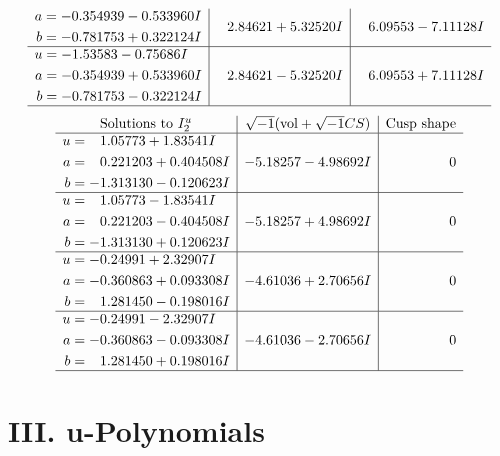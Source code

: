 \documentclass[1p]{elsarticle_modified}
\theoremstyle{definition}
\newcommand{\I}{\sqrt{-1}}
\begin{document}
$$\begin{array}{c|c|c}
\begin{aligned}
a &= -0.354939 - 0.533960 I \\
b &= -0.781753 + 0.322124 I\end{aligned}
 & \phantom{-}2.84621 + 5.32520 I & \phantom{-}6.09553 - 7.11128 I \\ \hline\begin{aligned}
u &= -1.53583 - 0.75686 I \\
a &= -0.354939 + 0.533960 I \\
b &= -0.781753 - 0.322124 I\end{aligned}
 & \phantom{-}2.84621 - 5.32520 I & \phantom{-}6.09553 + 7.11128 I\\
 \hline 
 \end{array}$$\newpage$$\begin{array}{c|c|c}  
\text{Solutions to }I^u_{2}& \I (\text{vol} + \sqrt{-1}CS) & \text{Cusp shape}\\
 \hline 
\begin{aligned}
u &= \phantom{-}1.05773 + 1.83541 I \\
a &= \phantom{-}0.221203 + 0.404508 I \\
b &= -1.313130 - 0.120623 I\end{aligned}
 & -5.18257 - 4.98692 I & \phantom{-0.000000 } 0 \\ \hline\begin{aligned}
u &= \phantom{-}1.05773 - 1.83541 I \\
a &= \phantom{-}0.221203 - 0.404508 I \\
b &= -1.313130 + 0.120623 I\end{aligned}
 & -5.18257 + 4.98692 I & \phantom{-0.000000 } 0 \\ \hline\begin{aligned}
u &= -0.24991 + 2.32907 I \\
a &= -0.360863 + 0.093308 I \\
b &= \phantom{-}1.281450 - 0.198016 I\end{aligned}
 & -4.61036 + 2.70656 I & \phantom{-0.000000 } 0 \\ \hline\begin{aligned}
u &= -0.24991 - 2.32907 I \\
a &= -0.360863 - 0.093308 I \\
b &= \phantom{-}1.281450 + 0.198016 I\end{aligned}
 & -4.61036 - 2.70656 I & \phantom{-0.000000 } 0\\
 \hline 
 \end{array}$$\newpage
\newpage\renewcommand{\arraystretch}{1}
\centering \section*{ III. u-Polynomials}
\end{document}
